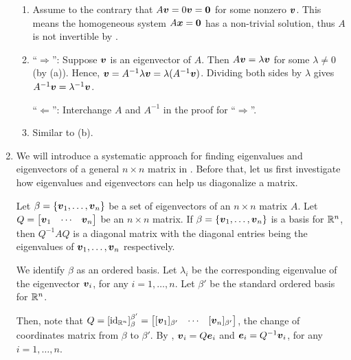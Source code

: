 \begin{enumerate}
\begin{pf}
\begin{enumerate}
\item Assume to the contrary that \(A\vb*{v}=0\vb*{v}=\vb*{0}\) for some
nonzero \(\vb*{v}\). This means the homogeneous system \(A\vb*{x}=\vb*{0}\)
has a non-trivial solution, thus \(A\) is not invertible by
.

\item ``\(\Rightarrow\)'': Suppose \(\vb*{v}\) is an eigenvector of \(A\).
Then \(A\vb*{v}=\lambda\vb*{v}\) for some \(\lambda\ne 0\) (by (a)). Hence,
\(\vb*{v}=A^{-1}\lambda\vb*{v}=\lambda(A^{-1}\vb*{v})\). Dividing both sides
by \(\lambda\) gives \(A^{-1}\vb*{v}=\lambda^{-1}\vb*{v}\).

``\(\Leftarrow\)'': Interchange \(A\) and \(A^{-1}\) in the proof for
``\(\Rightarrow\)''.

\item Similar to (b).
\end{enumerate}
\end{pf}
\item We will introduce a systematic approach for finding eigenvalues and
eigenvectors of a general \(n\times n\) matrix in .
Before that, let us first investigate how eigenvalues and eigenvectors can help
us diagonalize a matrix.

\begin{theorem}
\label{thm:eigen-diag}
Let \(\beta=\{\vb*{v}_1,\dotsc,\vb*{v}_n\}\) be a set of eigenvectors of an
\(n\times n\) matrix \(A\). Let \(Q=\mqty[\vect{v}_1&\cdots&\vect{v}_n]\) be an
\(n\times n\) matrix. If \(\beta=\{\vb*{v}_1,\dotsc,\vb*{v}_n\}\) is a basis for
\(\mathbb{R}^n\), then \(Q^{-1}AQ\) is a diagonal matrix with the diagonal entries
being the eigenvalues of \(\vb*{v}_1,\dotsc,\vb*{v}_n\) respectively.
\end{theorem}
\begin{pf}
We identify \(\beta\) as an ordered basis. Let \(\lambda_i\) be the
corresponding eigenvalue of the eigenvector \(\vb*{v}_i\), for any
\(i=1,\dotsc,n\). Let \(\beta'\) be the standard ordered basis for \(\mathbb{R}^n\).

Then, note that
\(Q=[\id_{\R^n}]_{\beta}^{\beta'}=\mqty[[\vect{v}_1]_{\beta'}&\cdots&[\vect{v}_n]_{\beta'}]\),
the change of coordinates matrix from \(\beta\) to \(\beta'\). By
, \(\vb*{v}_i=Q\vb*{e}_i\) and
\(\vb*{e}_i=Q^{-1}\vb*{v}_i\), for any \(i=1,\dotsc,n\).


\end{pf}
\end{enumerate}
